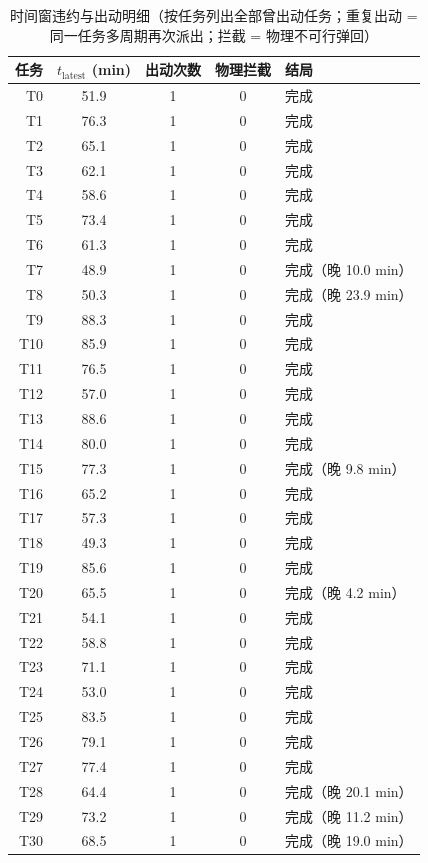 \documentclass[a4paper,11pt]{article}
\begin{document}
\begin{table}[htbp]\centering
\caption{时间窗违约与出动明细（按任务列出全部曾出动任务；重复出动 = 同一任务多周期再次派出；拦截 = 物理不可行弹回）}
\label{tab:exp01-tw}
\begin{tabular}{rcccl}
\toprule
任务 & $t_{\mathrm{latest}}$ (min) & 出动次数 & 物理拦截 & 结局 \\
\midrule
T0 & 51.9 & 1 & 0 & 完成 \\
T1 & 76.3 & 1 & 0 & 完成 \\
T2 & 65.1 & 1 & 0 & 完成 \\
T3 & 62.1 & 1 & 0 & 完成 \\
T4 & 58.6 & 1 & 0 & 完成 \\
T5 & 73.4 & 1 & 0 & 完成 \\
T6 & 61.3 & 1 & 0 & 完成 \\
T7 & 48.9 & 1 & 0 & 完成（晚 10.0 min） \\
T8 & 50.3 & 1 & 0 & 完成（晚 23.9 min） \\
T9 & 88.3 & 1 & 0 & 完成 \\
T10 & 85.9 & 1 & 0 & 完成 \\
T11 & 76.5 & 1 & 0 & 完成 \\
T12 & 57.0 & 1 & 0 & 完成 \\
T13 & 88.6 & 1 & 0 & 完成 \\
T14 & 80.0 & 1 & 0 & 完成 \\
T15 & 77.3 & 1 & 0 & 完成（晚 9.8 min） \\
T16 & 65.2 & 1 & 0 & 完成 \\
T17 & 57.3 & 1 & 0 & 完成 \\
T18 & 49.3 & 1 & 0 & 完成 \\
T19 & 85.6 & 1 & 0 & 完成 \\
T20 & 65.5 & 1 & 0 & 完成（晚 4.2 min） \\
T21 & 54.1 & 1 & 0 & 完成 \\
T22 & 58.8 & 1 & 0 & 完成 \\
T23 & 71.1 & 1 & 0 & 完成 \\
T24 & 53.0 & 1 & 0 & 完成 \\
T25 & 83.5 & 1 & 0 & 完成 \\
T26 & 79.1 & 1 & 0 & 完成 \\
T27 & 77.4 & 1 & 0 & 完成 \\
T28 & 64.4 & 1 & 0 & 完成（晚 20.1 min） \\
T29 & 73.2 & 1 & 0 & 完成（晚 11.2 min） \\
T30 & 68.5 & 1 & 0 & 完成（晚 19.0 min） \\

\end{tabular}
\end{table}
\end{document}
